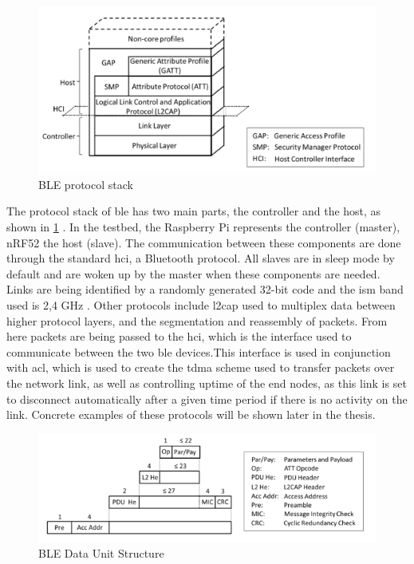 \begin{figure}[ht]
    \centering
    \includegraphics[scale=0.7]{BLEprotocolStack.png}    
    \caption{BLE protocol stack \cite{gomez2012overview}}
    \label{fig:BLEprotocolStack}
\end{figure}

\noindent The protocol stack of \gls{ble} has two main parts, the controller and the host, as shown in \ref{fig:BLEprotocolStack} \cite{gomez2012overview}. In the testbed, the \gls{Raspberry Pi} represents the controller (master), \gls{nRF52} the host (slave). The communication between these components are done through the standard \gls{hci}, a Bluetooth protocol. All slaves are in sleep mode by default and are woken up by the master when these components are needed. Links are being identified by a randomly generated 32-bit code and the \gls{ism} band used is 2,4 GHz \cite{gomez2012overview}. Other protocols include \gls{l2cap} used to multiplex data between higher protocol layers, and the segmentation and reassembly of packets. From here packets are being passed to the \gls{hci}, which is the interface used to communicate between the two \gls{ble} devices.This interface is used in conjunction with \gls{acl}, which is used to create the \gls{tdma} scheme used to transfer packets over the network link, as well as controlling uptime of the end nodes, as this link is set to disconnect automatically after a given time period if there is no activity on the link. Concrete examples of these protocols will be shown later in the thesis. 



\begin{figure}[ht]
    \centering
    \includegraphics[scale=0.7]{BLEdataUnitStructure.png}    
    \caption{BLE Data Unit Structure \cite{gomez2012overview}}
    \label{fig:BLEdataUnitStructure}
\end{figure}

